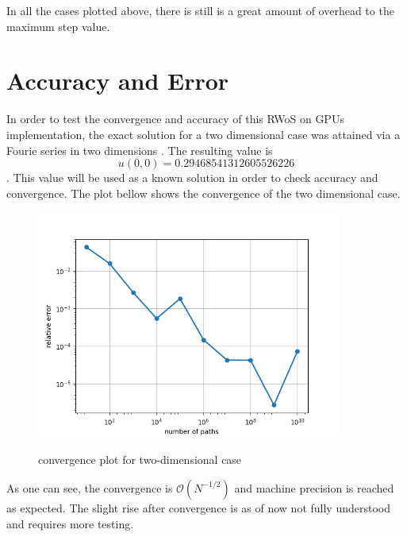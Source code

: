 In all the cases plotted above, there is still is a great amount of overhead
to the maximum step value.

\section{Accuracy and Error}
In order to test the convergence and accuracy of this \Gls{RWoS} on \Glspl{GPU} implementation,
the exact solution for a two dimensional case was attained via a Fourie series in
two dimensions \cite{Bornemann}.  The resulting value is  $$u(0,0) = 0.29468 54131 26055 26226$$.
This value will be used as a known solution in order to check accuracy and convergence.
The plot bellow shows the convergence of the two dimensional case.

\begin{figure}
\begin{center}
\includegraphics[width=10.0cm]{styles/convergence} \label{plot:convergence}
  \caption{convergence plot for two-dimensional case}
\end{center}
\end{figure}

As one can see, the convergence is $\mathcal{O}(N^{-1/2})$ and machine precision is reached
as expected.  The slight rise after convergence is as of now not fully understood and
requires more testing.


